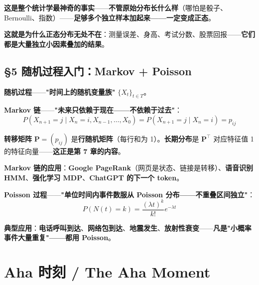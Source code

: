 \textbf{这是整个统计学最神奇的事实}——\textbf{不管原始分布长什么样}（哪怕是骰子、Bernoulli、指数）——\textbf{足够多个独立样本加起来——一定变成正态}。

\textbf{这就是为什么正态分布无处不在}：测量误差、身高、考试分数、股票回报——\textbf{它们都是大量独立小因素叠加的结果}。

\subsection{§5 随机过程入门：Markov + Poisson}

\textbf{随机过程}——\textbf{"时间上的随机变量族"} $\{X_t\}_{t \in T}$。

\textbf{Markov 链}——\textbf{"未来只依赖于现在——不依赖于过去"}：
\begin{equation}
P(X_{n+1} = j \mid X_n = i, X_{n-1}, \dots, X_0) = P(X_{n+1} = j \mid X_n = i) = p_{ij}
\end{equation}

\textbf{转移矩阵} $\bm{P} = (p_{ij})$ 是\textbf{行随机矩阵}（每行和为 1）。\textbf{长期分布}是 $\bm{P}^\top$ 对应特征值 1 的特征向量——\textbf{这正是第 7 章的内容}。

\textbf{Markov 链的应用}：\textbf{Google PageRank}（网页是状态、链接是转移）、\textbf{语音识别 HMM}、\textbf{强化学习 MDP}、\textbf{ChatGPT 的下一个 token}。

\textbf{Poisson 过程}——\textbf{"单位时间内事件数服从 Poisson 分布——不重叠区间独立"}：
\begin{equation}
P(N(t) = k) = \frac{(\lambda t)^k}{k!} e^{-\lambda t}
\end{equation}

\textbf{典型应用}：\textbf{电话呼叫到达}、\textbf{网络包到达}、\textbf{地震发生}、\textbf{放射性衰变}——\textbf{凡是"小概率事件大量重复"——都用 Poisson}。

\section{Aha 时刻 / The Aha Moment}

